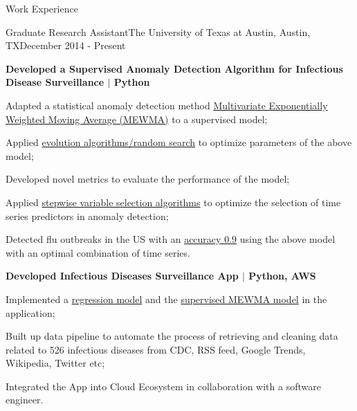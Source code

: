 \documentclass{my_resume} %
\begin{document}
\begin{rSection}{Work Experience}
  \begin{rSubsection}{Graduate Research Assistant}{The University of Texas at
    Austin, Austin, TX}{December 2014 - Present}
  \item[] \textbf{Developed a Supervised Anomaly Detection Algorithm for Infectious
    Disease Surveillance $|$ Python}
    \item Adapted a statistical anomaly detection method \underline{Multivariate
      Exponentially Weighted Moving Average (MEWMA)} to a supervised model;
    \item Applied \underline{evolution algorithms/random search} to optimize
      parameters of the above model;
    \item Developed novel metrics to evaluate the performance of the model;
    \item Applied \underline{stepwise variable selection algorithms} to
      optimize the selection of time series predictors in anomaly detection;
    \item Detected flu outbreaks in the US with an \underline{accuracy
      0.9} using the above model with an optimal combination of time series.
\vspace{1mm}
  \item[] \textbf{Developed Infectious Diseases Surveillance App $|$ Python, AWS}
    \item Implemented a \underline{regression model} and the
      \underline{supervised MEWMA model} in the application;
    \item Built up data pipeline to automate the process of retrieving and
      cleaning data related to 526 infectious diseases from CDC, RSS feed, Google
      Trends, Wikipedia, Twitter etc;
    \item Integrated the App into Cloud Ecosystem in collaboration with a
      software engineer.


  \end{rSubsection}
\end{rSection}
\end{document}
